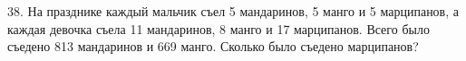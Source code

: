 38. На празднике каждый мальчик съел 5 мандаринов, 5 манго и 5 марципанов, а каждая девочка съела 11 мандаринов, 8 манго и 17 марципанов. Всего было съедено 813 мандаринов и 669 манго. Сколько было съедено марципанов?\\
